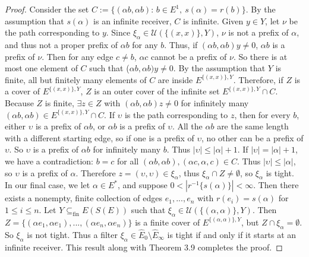 \documentclass[12pt]{article}
\theoremstyle{definition}
\begin{document}
\begin{proof}
    Consider the set $C := \{ (\alpha b, \alpha b)\text{: } b \in E^1, \ s(\alpha) = r(b) \}$. By the assumption
    that $s(\alpha)$ is an infinite receiver, $C$ is infinite. Given $y \in Y$, let $\nu$ be the path corresponding to $y$.
    Since $\xi_\alpha \in \mathcal{U}(\{(x, x)\}, Y)$, $\nu$ is not a prefix of $\alpha$, and thus not a proper prefix of $\alpha b$ 
    for any $b$. Thus, if $(\alpha b, \alpha b)y \neq 0$, $\alpha b$ is a prefix of $\nu$. Then for any edge $c \neq b$, 
    $\alpha c$ cannot be a prefix of $\nu$. So there is at most one element of $C$ such that ($\alpha b, \alpha b)y \neq 0$.
    By the assumption that $Y$ is finite, all but finitely many elements of $C$ are inside $E^{\{(x, x)\}, Y}$. Therefore, if $Z$
    is a cover of $E^{\{(x, x)\}, Y}$, $Z$ is an outer cover of the infinite set $E^{\{(x, x)\}, Y} \cap C$. Because $Z$ is finite, $\exists z \in Z$ 
    with $(\alpha b, \alpha b)z \neq 0$ for infinitely many $(\alpha b, \alpha b) \in E^{\{(x, x)\}, Y} \cap C$. If $\upsilon$ is the path corresponding to $z$,
    then for every $b$, either $\upsilon$ is a prefix of $\alpha b$, or $\alpha b$ is a prefix of $\upsilon$.
    All the $\alpha b$ are the same length with a different starting edge, so if one is a prefix of $\upsilon$,
    no other can be a prefix of $\upsilon$. So $\upsilon$ is a prefix of $\alpha b$ for infinitely many $b$. Thus $|\upsilon| \leq |\alpha| + 1$.
    If $|\upsilon| = |\alpha| + 1$, we have a contradiction: $b = c$ for all $(\alpha b, \alpha b), (\alpha c, \alpha, c) \in C$.
    Thus $|\upsilon| \leq |\alpha|$, so $\upsilon$ is a prefix of $\alpha$. Therefore $z = (\upsilon, \upsilon) \in \xi_\alpha$, thus 
    $\xi_\alpha \cap Z \neq \emptyset$, so $\xi_\alpha$ is tight.
    \newline
    In our final case, we let $\alpha \in E^*$, and suppose $0 < |r^{-1}\{s(\alpha)\}| < \infty$. Then
    there exists a nonempty, finite collection of edges $e_1, ..., e_n$ with $r(e_i) = s(\alpha)$ for $1 \leq i \leq n$.
    Let $Y \subseteq_\text{fin} E(S(E))$ such that $\xi_\alpha \in \mathcal{U}(\{(\alpha, \alpha)\}, Y)$. 
    Then $Z = \{(\alpha e_1, \alpha e_1), ..., (\alpha e_n, \alpha e_n)\}$ is a finite cover of $E^{\{(\alpha, \alpha)\}, Y}$,
    but $Z \cap \xi_\alpha = \emptyset$. So $\xi_\alpha$ is not tight. Thus a filter $\xi_\alpha \in \hat{E}_0 \setminus \hat{E}_\infty$
    is tight if and only if it starts at an infinite receiver. This result along with Theorem 3.9 completes the proof.
\end{proof}
\end{document}
